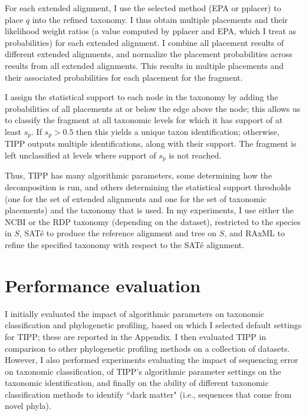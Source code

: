 For each extended alignment, 
I use the selected method (EPA or pplacer) to place
$q$ into the refined taxonomy.
I thus obtain multiple placements and their likelihood weight ratios
(a value computed by pplacer and EPA,
which I treat as probabilities) for each extended alignment.
I combine all placement results of different extended alignments, and normalize the
placement probabilities across results from all extended alignments.
This results in  multiple placements and their 
associated probabilities for each placement for the fragment. 

I assign the statistical support to each node in the taxonomy
by adding the probabilities of all 
placements at or below the edge above the node;
this allows us to
classify the fragment at all taxonomic levels for 
which it has  support of at least $s_p$. 
If $s_p>0.5$ then
this yields a unique taxon identification; otherwise,
TIPP outputs multiple identifications, along with their support. 
The fragment is left unclassified at levels where 
support of $s_p$ is not reached.

Thus, TIPP has many  algorithmic parameters, some
determining how the decomposition is run, and others
determining the statistical support thresholds (one
for the set of extended alignments and one for the
set of
taxonomic placements) and
the taxonomy that is used.
In my experiments,
I use either the NCBI or the RDP taxonomy
(depending on the dataset),
restricted to the species in $S$, 
SAT\'{e} to produce the reference
alignment and tree on $S$, and RAxML to refine the
specified taxonomy with respect to the SAT\'{e} alignment.

\section{Performance evaluation}\label{tipp:evaluation}
I initially evaluated the impact of 
algorithmic parameters on taxonomic classification and
phylogenetic profiling, based on which I
selected default settings for TIPP; these are
reported in the Appendix.
I then evaluated TIPP in comparison 
to other phylogenetic profiling methods on
a collection of datasets. 
However, I also 
performed experiments evaluating the impact
of sequencing error on taxonomic classification,
of TIPP's
algorithmic parameter settings on the
taxonomic identification, and finally
on the ability of different taxonomic classification
methods to identify ``dark matter" (i.e., sequences
that come from novel phyla). 

